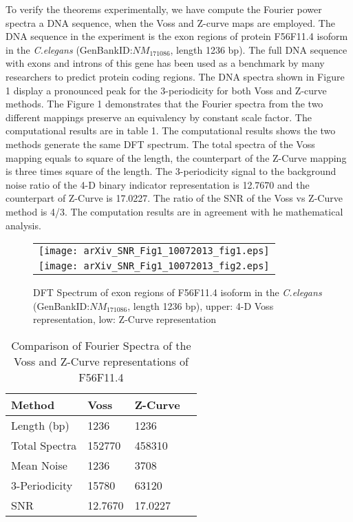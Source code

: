 \documentclass[preprint,authoryear,12pt]{elsarticle}
\begin{document}
To verify the theorems experimentally, we have compute the Fourier power spectra a DNA sequence, when the Voss and Z-curve maps are employed. The DNA sequence in the experiment is the exon regions of protein F56F11.4 isoform in the \emph{C.elegans} (GenBankID:$NM_171086$, length 1236 bp). The full DNA sequence with exons and introns of this gene has been used as a benchmark by many researchers to predict protein coding regions\citep{anastassiou2001genomic,yin2007prediction,jiang2008coding}. The DNA spectra shown in Figure 1 display a pronounced peak for the 3-periodicity for both Voss and Z-curve methods. The Figure 1 demonstrates that the Fourier spectra from the two different mappings preserve an equivalency by constant scale factor. The computational results are in table 1. The computational results shows the two methods generate the same DFT spectrum. The total spectra of the Voss mapping equals to square of the length, the counterpart of the Z-Curve mapping is three times square of the length. The 3-periodicity signal to the background noise ratio of the 4-D binary indicator representation is 12.7670 and the counterpart of Z-Curve is 17.0227. The ratio of the SNR of the Voss vs Z-Curve method is 4/3. The computation results are in agreement with he mathematical analysis.\\
\begin{figure}
\centering
\begin{tabular}{c}
\texttt{[image: arXiv\_SNR\_Fig1\_10072013\_fig1.eps]} \\
\texttt{[image: arXiv\_SNR\_Fig1\_10072013\_fig2.eps]} \\
\end{tabular}
\caption{DFT Spectrum of exon regions of F56F11.4 isoform in the \emph{C.elegans} (GenBankID:$NM_171086$, length 1236 bp), upper: 4-D Voss representation, low: Z-Curve representation}
\end{figure}

\begin{table}[ht]
\caption{Comparison of Fourier Spectra of the Voss and Z-Curve representations of F56F11.4 } \centering \begin{tabular}{l l l l} \hline\hline Method & Voss & Z-Curve  \\ [0.5ex] \hline Length (bp) &  1236 & 1236 \\
    Total Spectra & 152770 & 458310 \\
    Mean Noise &  1236 & 3708 \\
    3-Periodicity & 15780 &  63120  \\
    SNR & 12.7670 &  17.0227  \\
\hline \end{tabular}
\label{table:nonlin} \end{table}
\end{document}
